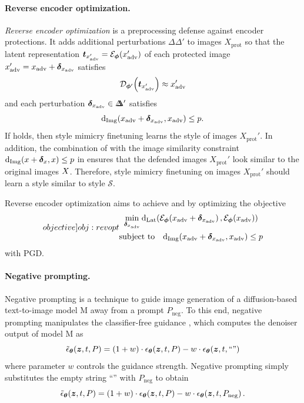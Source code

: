 \documentclass{article}
\newcommand{\style}[1]{\mathcal{#1}}
\newcommand{\model}[1]{\mathrm{#1}}
\newcommand{\enc}[0]{\mathcal{E}_{\vphi}}
\newcommand{\dec}[0]{\mathcal{D}_{\vphi'}}
\newcommand{\denoiser}[0]{\eps_{\vtheta}}
\newcommand{\cfgdenoiser}[0]{\tilde{\eps}_{\vtheta}}
\newcommand{\advimg}[0]{x_{\textrm{adv}}}
\newcommand{\advimgset}[0]{X_{\textrm{prot}}}
\newcommand{\imgsimilarity}[0]{d_{\mathrm{Img}}}
\newcommand{\latentdist}[0]{d_{\mathrm{Lat}}}
\newcommand{\sDelta}{\Delta\!\!\!\!\Delta}
\newcommand{\negprompt}[0]{P_{\textrm{neg}}}
\begin{document}
\paragraph{Reverse encoder optimization.}
\textit{Reverse encoder optimization} is a preprocessing defense against encoder protections.
It adds additional perturbations $\sDelta'$ to images $\advimgset$ so that the latent representation $\vt_{\advimg'} = \f{\enc}{\advimg'}$ of each protected image
$\advimg' = \advimg + \vdelta_{\advimg}$ satisfies 
\begin{equation}
    \label{eq:revencoptlat}
    \f{\dec}{\vt_{\advimg'}} \approx \advimg'
\end{equation}
and each perturbation $\vdelta_{\advimg} \in \sDelta'$ satisfies
\begin{equation}
    \label{eq:revencoptimg}
    \f{\imgsimilarity}{\advimg + \vdelta_{\advimg}, \advimg} \leq p.
\end{equation}
If  holds, then style mimicry finetuning learns the
style of images $\advimgset'$. 
In addition, the combination of  with the image similarity constraint $\f{\imgsimilarity}{x + \vdelta_x, x} \leq p$ in  ensures that the defended images $\advimgset'$ look similar to the original images $X$. Therefore, style mimicry finetuning on images $\advimgset'$ should learn a style similar to style $\style{S}$.

Reverse encoder optimization aims to achieve  and  by optimizing the objective
\begin{equation}
\label[objective]{obj:revopt}
\begin{gathered}
\min_{\vdelta_{\advimg}} \f{\latentdist}{\f{\enc}{\advimg + \vdelta_{\advimg}}, \f{\enc}{\advimg}} \\
\text{subject to} \quad \f{\imgsimilarity}{\advimg + \vdelta_{\advimg}, \advimg} \leq p
\end{gathered}
\end{equation}
with PGD.

\paragraph{Negative prompting.}
\label{sec:negprompt}
Negative prompting \citep{miyake2023negative} is a technique to guide image generation of a diffusion-based text-to-image model $\model{M}$ away from a prompt $\negprompt$. To this end, negative prompting manipulates the
classifier-free guidance \citep{classifierfreeguidance}, which computes the denoiser output of model $\model{M}$ as
\begin{equation}
    \label{eq:cfg}
    \f{\cfgdenoiser}{\vz, t, P} = \brace{1+w}\cdot\f{\denoiser}{\vz, t, P} - w\cdot\f{\denoiser}{\vz, t, \text{``''}}
\end{equation}
where parameter $w$ controls the guidance strength.
Negative prompting simply substitutes the empty string ``'' with $\negprompt$ to obtain
\begin{equation}
    \label{eq:negprompt}
    \f{\cfgdenoiser}{\vz, t, P} = \brace{1+w}\cdot\f{\denoiser}{\vz, t, P} - w\cdot\f{\denoiser}{\vz, t, \negprompt}.
\end{equation}
\end{document}
